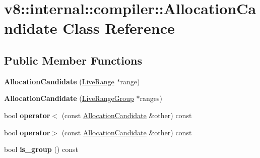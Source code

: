\hypertarget{classv8_1_1internal_1_1compiler_1_1_allocation_candidate}{}\section{v8\+:\+:internal\+:\+:compiler\+:\+:Allocation\+Candidate Class Reference}
\label{classv8_1_1internal_1_1compiler_1_1_allocation_candidate}
\subsection*{Public Member Functions}
\begin{DoxyCompactItemize}
\item 
{\bfseries Allocation\+Candidate} (\hyperlink{classv8_1_1internal_1_1compiler_1_1_live_range}{Live\+Range} $\ast$range)\hypertarget{classv8_1_1internal_1_1compiler_1_1_allocation_candidate_a3e140e7b35ae72e52535935f4822bca9}{}\label{classv8_1_1internal_1_1compiler_1_1_allocation_candidate_a3e140e7b35ae72e52535935f4822bca9}

\item 
{\bfseries Allocation\+Candidate} (\hyperlink{classv8_1_1internal_1_1compiler_1_1_live_range_group}{Live\+Range\+Group} $\ast$ranges)\hypertarget{classv8_1_1internal_1_1compiler_1_1_allocation_candidate_a65a45c65bc233708cf32069ec77a29f7}{}\label{classv8_1_1internal_1_1compiler_1_1_allocation_candidate_a65a45c65bc233708cf32069ec77a29f7}

\item 
bool {\bfseries operator$<$} (const \hyperlink{classv8_1_1internal_1_1compiler_1_1_allocation_candidate}{Allocation\+Candidate} \&other) const \hypertarget{classv8_1_1internal_1_1compiler_1_1_allocation_candidate_a7cf271b7cb8e74a59d544e6234b9c816}{}\label{classv8_1_1internal_1_1compiler_1_1_allocation_candidate_a7cf271b7cb8e74a59d544e6234b9c816}

\item 
bool {\bfseries operator$>$} (const \hyperlink{classv8_1_1internal_1_1compiler_1_1_allocation_candidate}{Allocation\+Candidate} \&other) const \hypertarget{classv8_1_1internal_1_1compiler_1_1_allocation_candidate_a139b67ca930375b1a9f919e87d221921}{}\label{classv8_1_1internal_1_1compiler_1_1_allocation_candidate_a139b67ca930375b1a9f919e87d221921}

\item 
bool {\bfseries is\+\_\+group} () const \hypertarget{classv8_1_1internal_1_1compiler_1_1_allocation_candidate_a67cc07784837a85a82c1b520cb6f145c}{}\label{classv8_1_1internal_1_1compiler_1_1_allocation_candidate_a67cc07784837a85a82c1b520cb6f145c}


\end{DoxyCompactItemize}
